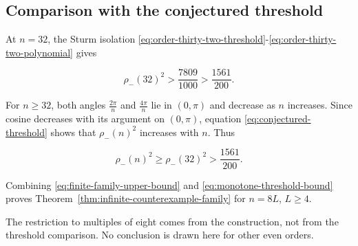 \subsection{Comparison with the conjectured threshold}

At \(n=32\), the Sturm isolation \eqref{eq:order-thirty-two-threshold}-\eqref{eq:order-thirty-two-polynomial} gives

\begin{equation}
\label{eq:threshold-at-thirty-two}
\rho_-(32)^{2}>\frac{7809}{1000}>\frac{1561}{200}.
\end{equation}

For \(n\geq 32\), both angles \(\frac{2\pi}{n}\) and \(\frac{4\pi}{n}\) lie in \((0,\pi)\) and decrease as
\(n\) increases. Since cosine decreases with its argument on \((0,\pi)\), equation
\eqref{eq:conjectured-threshold} shows that \(\rho_-(n)^{2}\) increases with \(n\). Thus

\begin{equation}
\label{eq:monotone-threshold-bound}
\rho_-(n)^{2}\geq \rho_-(32)^{2}>\frac{1561}{200}.
\end{equation}

Combining \eqref{eq:finite-family-upper-bound} and \eqref{eq:monotone-threshold-bound} proves Theorem~\ref{thm:infinite-counterexample-family} for \(n=8L\), \(L\geq 4\).

The restriction to multiples of eight comes from the construction, not from
the threshold comparison. No conclusion is drawn here for other even orders.
